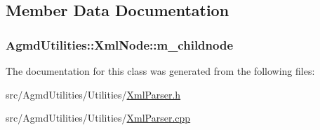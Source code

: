 \subsection{Member Data Documentation}
\hypertarget{class_agmd_utilities_1_1_xml_node_aa71154bbe16cd1d243ff17fa8555eeca}{
\subsubsection[{m\+\_\+childnode}]{ Agmd\+Utilities\+::\+Xml\+Node\+::m\+\_\+childnode\hspace{0.3cm}{\ttfamily [protected]}}}\label{class_agmd_utilities_1_1_xml_node_aa71154bbe16cd1d243ff17fa8555eeca}


The documentation for this class was generated from the following files\+:\begin{DoxyCompactItemize}
\item 
src/\+Agmd\+Utilities/\+Utilities/\hyperlink{_xml_parser_8h}{Xml\+Parser.\+h}\item 
src/\+Agmd\+Utilities/\+Utilities/\hyperlink{_xml_parser_8cpp}{Xml\+Parser.\+cpp}\end{DoxyCompactItemize}
